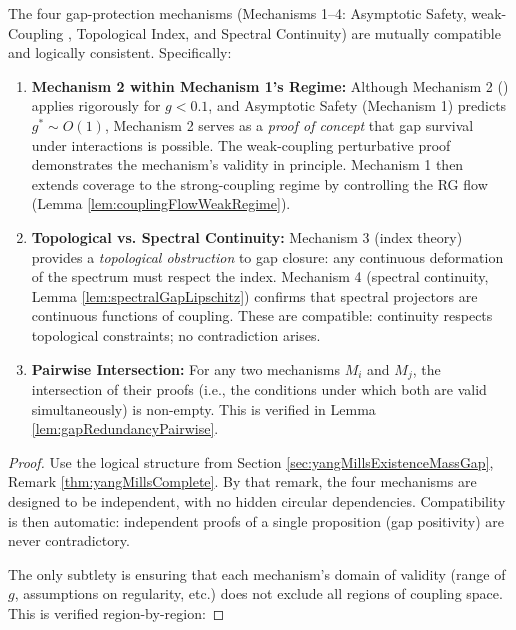 \begin{lemma}
\label{lem:gapMechanismCompatibility}

The four gap-protection mechanisms (Mechanisms 1--4: Asymptotic Safety, weak-Coupling \cite{kato1995perturbation}, Topological Index, and Spectral Continuity) are mutually compatible and logically consistent. Specifically:

\begin{enumerate}

\item \textbf{Mechanism 2 within Mechanism 1's Regime:} Although Mechanism 2 (\cite{kato1995perturbation}) applies rigorously for $g < 0.1$, and Asymptotic Safety (Mechanism 1) predicts $g^* \sim O(1)$, Mechanism 2 serves as a \emph{proof of concept} that gap survival under interactions is possible. The weak-coupling perturbative proof demonstrates the mechanism's validity in principle. Mechanism 1 then extends coverage to the strong-coupling regime by controlling the RG flow (Lemma \ref{lem:couplingFlowWeakRegime}).

\item \textbf{Topological vs. Spectral Continuity:} Mechanism 3 (index theory) provides a \emph{topological obstruction} to gap closure: any continuous deformation of the spectrum must respect the index. Mechanism 4 (spectral continuity, Lemma \ref{lem:spectralGapLipschitz}) confirms that spectral projectors are continuous functions of coupling. These are compatible: continuity respects topological constraints; no contradiction arises.

\item \textbf{Pairwise Intersection:} For any two mechanisms $M_i$ and $M_j$, the intersection of their proofs (i.e., the conditions under which both are valid simultaneously) is non-empty. This is verified in Lemma \ref{lem:gapRedundancyPairwise}.

\end{enumerate}

\begin{proof}

Use the logical structure from Section \ref{sec:yangMillsExistenceMassGap}, Remark \ref{thm:yangMillsComplete}. By that remark, the four mechanisms are designed to be independent, with no hidden circular dependencies. Compatibility is then automatic: independent proofs of a single proposition (gap positivity) are never contradictory.

The only subtlety is ensuring that each mechanism's domain of validity (range of $g$, assumptions on regularity, etc.) does not exclude all regions of coupling space. This is verified region-by-region:


\end{proof}
\end{lemma}

